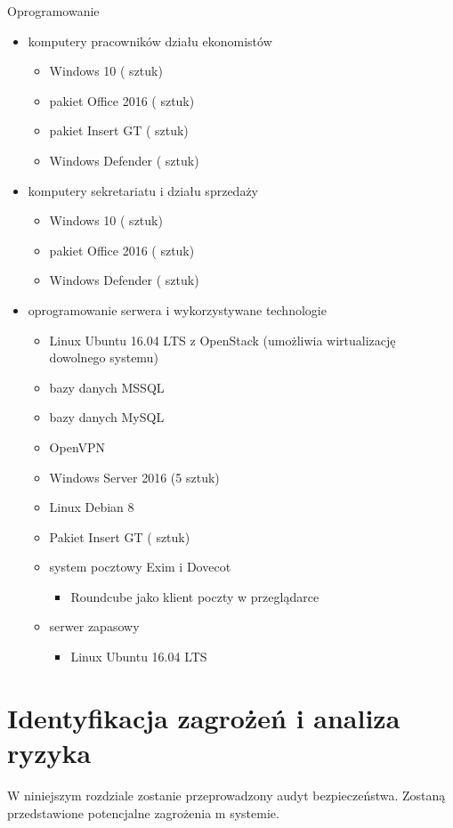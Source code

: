 Oprogramowanie
\begin{itemize}
	\item komputery pracowników działu ekonomistów
	\begin{itemize}
		\item Windows 10 ( sztuk)
		\item pakiet Office 2016 ( sztuk)
		\item pakiet Insert GT ( sztuk)
		\item Windows Defender ( sztuk)
	\end{itemize}
	\item komputery sekretariatu i działu sprzedaży
	\begin{itemize}
		\item Windows 10 ( sztuk)
		\item pakiet Office 2016 ( sztuk)
		\item Windows Defender ( sztuk)
	\end{itemize}
	\item oprogramowanie serwera i wykorzystywane technologie
	\begin{itemize}
		\item Linux Ubuntu 16.04 LTS z OpenStack (umożliwia wirtualizację
		dowolnego systemu)
		\item bazy danych MSSQL
		\item bazy danych MySQL
		\item OpenVPN
		\item Windows Server 2016 (5 sztuk)
		\item Linux Debian 8
		\item Pakiet Insert GT ( sztuk)
		\item system pocztowy Exim i Dovecot
		\begin{itemize}
			\item Roundcube jako klient poczty w przeglądarce
		\end{itemize}
		\item serwer zapasowy
		\begin{itemize}
			\item Linux Ubuntu 16.04 LTS
		\end{itemize} 
	\end{itemize}
\end{itemize}

\newpage\section{Identyfikacja zagrożeń i analiza \newline ryzyka}
W niniejszym rozdziale zostanie przeprowadzony audyt bezpieczeństwa. Zostaną przedstawione potencjalne zagrożenia m systemie.

